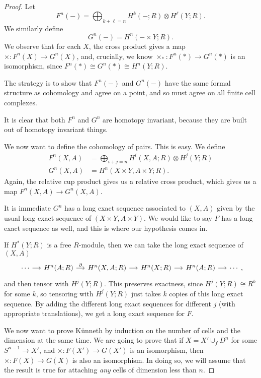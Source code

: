 \documentclass[a4paper]{article}
\theoremstyle{definition}
\begin{document}
\begin{proof}
  Let
  \[
    F^n(-) = \bigoplus_{k + \ell = n} H^k(-; R) \otimes H^\ell(Y; R).
  \]
  We similarly define
  \[
    G^n(-) = H^n(-\times Y; R).
  \]
  We observe that for each $X$, the cross product gives a map $\times: F^n(X) \to G^n(X)$, and, crucially, we know $\times_*: F^n(*) \to G^n(*)$ is an isomorphism, since $F^n(*) \cong G^n(*) \cong H^n(Y; R)$.

  The strategy is to show that $F^n(-)$ and $G^n(-)$ have the same formal structure as cohomology and agree on a point, and so must agree on all finite cell complexes.

  \separator

  It is clear that both $F^n$ and $G^n$ are homotopy invariant, because they are built out of homotopy invariant things.

  \separator

  We now want to define the cohomology of pairs. This is easy. We define
  \begin{align*}
    F^n(X, A) &= \bigoplus_{i + j = n} H^i(X, A; R) \otimes H^j(Y; R)\\
    G^n(X, A) &= H^n(X \times Y, A \times Y; R).
  \end{align*}
  Again, the relative cup product gives us a relative cross product, which gives us a map $F^n(X, A) \to G^n(X, A)$.

  It is immediate $G^n$ has a long exact sequence associated to $(X, A)$ given by the usual long exact sequence of $(X \times Y, A \times Y)$. We would like to say $F$ has a long exact sequence as well, and this is where our hypothesis comes in.

  If $H^*(Y; R)$ is a free $R$-module, then we can take the long exact sequence of $(X, A)$
  \[
    \begin{tikzcd}[column sep=small]
      \cdots \ar[r] & H^n(A; R) \ar[r, "\partial"] & H^n(X , A ; R) \ar[r] & H^n(X ; R) \ar[r] & H^n(A ; R) \ar[r] & \cdots
    \end{tikzcd},
  \]
  and then tensor with $H^j(Y; R)$. This preserves exactness, since $H^j(Y; R) \cong R^k$ for some $k$, so tensoring with $H^j(Y; R)$ just takes $k$ copies of this long exact sequence. By adding the different long exact sequences for different $j$ (with appropriate translations), we get a long exact sequence for $F$.

  \separator

  We now want to prove K\"unneth by induction on the number of cells and the dimension at the same time. We are going to prove that if $X = X' \cup_f D^n$ for some $S^{n - 1} \to X'$, and $\times: F(X') \to G(X')$ is an isomorphism, then $\times: F(X) \to G(X)$ is also an isomorphism. In doing so, we will assume that the result is true for attaching \emph{any} cells of dimension less than $n$.


\end{proof}
\end{document}
